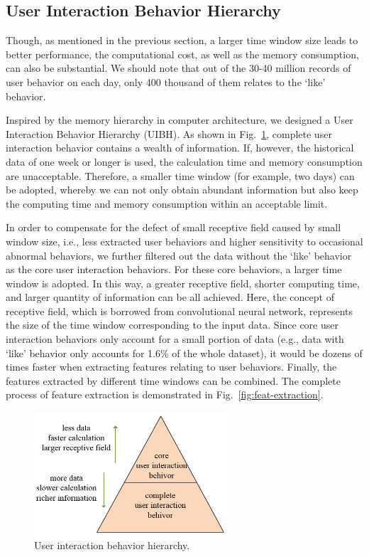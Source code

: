 \documentclass{article}
\begin{document}
\subsection{User Interaction Behavior Hierarchy}
\label{sec:user-interaction-behavior-hierarchy}

Though, as mentioned in the previous section, a larger time window size leads to better performance, the computational cost, as well as the memory consumption, can also be substantial. We should note that out of the 30-40 million records of user behavior on each day, only 400 thousand of them relates to the ‘like’ behavior.

Inspired by the memory hierarchy in computer architecture, we designed a User Interaction Behavior Hierarchy (UIBH). As shown in Fig.~\ref{fig:user-inter-behav-hierachy}, complete user interaction behavior contains a wealth of information. If, however, the historical data of one week or longer is used, the calculation time and memory consumption are unacceptable. Therefore, a smaller time window (for example, two days) can be adopted, whereby we can not only obtain abundant information but also keep the computing time and memory consumption within an acceptable limit.

In order to compensate for the defect of small receptive field caused by small window size, i.e., less extracted user behaviors and higher sensitivity to occasional abnormal behaviors, we further filtered out the data without the ‘like’ behavior as the core user interaction behaviors. For these core behaviors, a larger time window is adopted. In this way, a greater receptive field, shorter computing time, and larger quantity of information can be all achieved. Here, the concept of receptive field, which is borrowed from convolutional neural network, represents the size of the time window corresponding to the input data. Since core user interaction behaviors only account for a small portion of data (e.g., data with ‘like’ behavior only accounts for 1.6\% of the whole dataset), it would be dozens of times faster when extracting features relating to user behaviors. Finally, the features extracted by different time windows can be combined. The complete process of feature extraction is demonstrated in Fig.~\ref{fig:feat-extraction}.

\begin{figure}[h]
  \centering
  \includegraphics[width=7.2cm]{media/user-inter-behav-hierachy}
  \caption{User interaction behavior hierarchy.}
  \label{fig:user-inter-behav-hierachy}
\end{figure}
\end{document}
